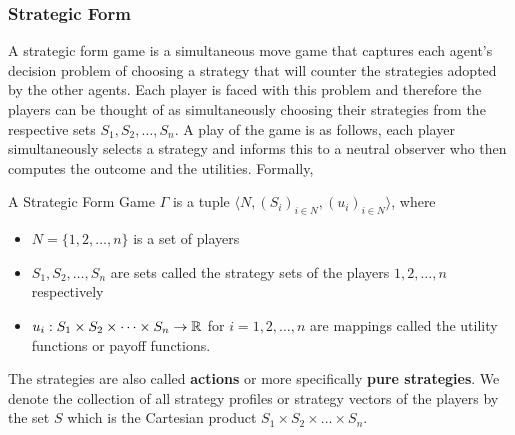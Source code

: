 \subsubsection{Strategic Form}
A strategic form game is a simultaneous move game that captures each agent's decision problem of choosing a strategy that will counter the strategies adopted by the other agents.
Each player is faced with this problem and therefore the players can be thought of as simultaneously choosing their strategies from the respective sets $S_1,S_2,\ldots,S_n$.
A play of the game is as follows, each player simultaneously selects a strategy and informs this to a neutral observer who then computes the outcome and the utilities. Formally,
\begin{defn}{\label{def:sfg}}
    A Strategic Form Game $\Gamma$ is a tuple $\langle N,(S_i)_{i\in N},(u_i)_{i\in N}\rangle$, where
    \begin{itemize}
        \item $N=\{1,2,\ldots,n\}$ is a set of players
        \item $S_1,S_2,\ldots,S_n$ are sets called the strategy sets of the players $1,2,\ldots,n$ respectively
        \item $u_i : S_1 \times S_2 \times \cdots \times S_n \rightarrow \mathbb{R}$ for $i = 1, 2,\ldots, n$ are mappings called the utility functions or payoff functions.
    \end{itemize}
\end{defn}
The strategies are also called \textbf{actions} or more specifically \textbf{pure strategies}.
We denote the collection of all strategy profiles or strategy vectors of the players by the set $S$ which is the Cartesian product $S_1 \times S_2 \times \ldots \times S_n$.
